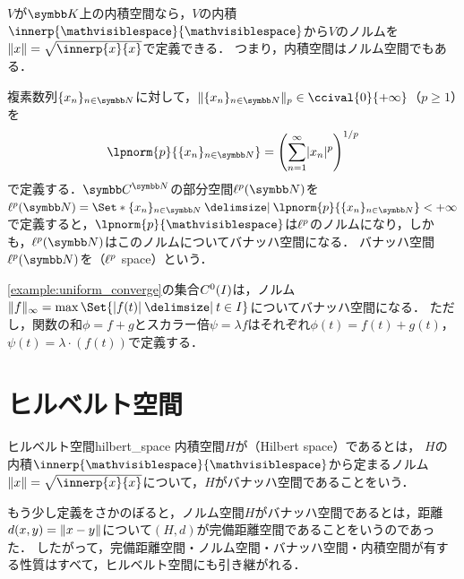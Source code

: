 \documentclass[../../main]{subfiles}
\begin{document}
\begin{example}
  \(V\)が\(\numset{K}\)上の内積空間なら，\(V\)の内積\(\innerp{\holder}{\holder}\)から\(V\)のノルムを\(\vnorm{x}=\sqrt{\innerp{x}{x}}\)で定義できる．
  つまり，内積空間はノルム空間でもある．
\end{example}

\begin{example}[\(\lebesgue{p}\)空間]
  複素数列\(\seq{x_n}_{n\in\numset{N}}\)に対して，\(\vnorm{\seq{x_n}_{n\in\numset{N}}}_p\in\ccival{0}{+\infty}\)（\(p\geq 1\)）を
  \[
    \lpnorm{p}{\seq{x_n}_{n\in\numset{N}}} = \pqty*{\sum_{n=1}^\infty\abs{x_n}^p}^{1/p}
  \]
  で定義する．\(\numset{C}^{\numset{N}}\)の部分空間\(\lebesgue{p}(\numset{N})\)を\(\lebesgue{p}(\numset{N})=\Set*{\seq{x_n}_{n\in\numset{N}}\given\lpnorm{p}{\seq{x_n}_{n\in\numset{N}}}<+\infty}\)
  で定義すると，\(\lpnorm{p}{\holder}\)は\(\lebesgue{p}\)のノルムになり，しかも，\(\lebesgue{p}(\numset{N})\)はこのノルムについてバナッハ空間になる．
  バナッハ空間\(\lebesgue{p}(\numset{N})\)を（\(\lebesgue{p}\) space）という．
\end{example}

\begin{example}
  \cref{example:uniform_converge}の集合\(C^0(I)\)は，ノルム\(\vnorm{f}_\infty=\max\Set{\abs{f(t)}\given t\in I}\)についてバナッハ空間になる．
  ただし，関数の和\(\phi=f+g\)とスカラー倍\(\psi=\lambda f\)はそれぞれ\(\phi(t)=f(t)+g(t)\)，\(\psi(t)=\lambda\cdot(f(t))\)で定義する．
\end{example}

\section{ヒルベルト空間}

\begin{definition}{ヒルベルト空間}{hilbert_space}
  内積空間\(H\)が（Hilbert space）であるとは，
  \(H\)の内積\(\innerp{\holder}{\holder}\)から定まるノルム\(\vnorm{x}=\sqrt{\innerp{x}{x}}\)について，\(H\)がバナッハ空間であることをいう．
\end{definition}

もう少し定義をさかのぼると，ノルム空間\(H\)がバナッハ空間であるとは，距離\(d(x,y)=\lVert x-y\rVert\)について\((H,d)\)が完備距離空間であることをいうのであった．
したがって，完備距離空間・ノルム空間・バナッハ空間・内積空間が有する性質はすべて，ヒルベルト空間にも引き継がれる．
\end{document}
